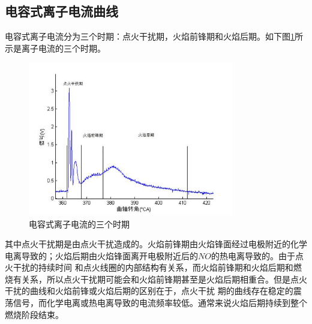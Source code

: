 \subsection{电容式离子电流曲线}
电容式离子电流分为三个时期：点火干扰期，火焰前锋期和火焰后期。如下图\ref{fig:ion_basic}所示是离子电流的三个时期。
\begin{figure}[!h]
	\centering
	\includegraphics[width = 0.8\textwidth]{thesis_figure/model_chapter/ion_basic}
	\caption{电容式离子电流的三个时期}
	\label{fig:ion_basic}
\end{figure}
其中点火干扰期是由点火干扰造成的。火焰前锋期由火焰锋面经过电极附近的化学电离导致的；火焰后期由火焰锋面离开电极附近后的$NO$的热电离导致的。由于点火干扰的持续时间
和点火线圈的内部结构有关系，而火焰前锋期和火焰后期和燃烧有关系，所以点火干扰期可能会和火焰前锋期甚至是火焰后期相重合。但是点火干扰的曲线和火焰前锋或火焰后期的区别在于，点火干扰
期的曲线存在稳定的震荡信号，而化学电离或热电离导致的电流频率较低。通常来说火焰后期持续到整个燃烧阶段结束。
